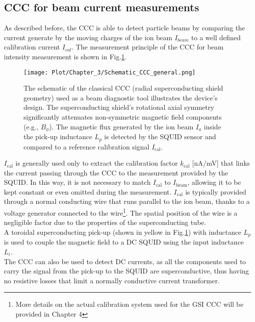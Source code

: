 \documentclass[12pt,a4paper]{report}
\begin{document}
    \subsection{CCC for beam current measurements}
    As described before, the CCC is able to detect particle beams by comparing the current generate by the moving charges of the ion beam $I_{beam}$ to a well defined calibration current $I_{cal}$. The measurement principle of the CCC for beam intensity measurement is shown in Fig.\ref{CH3_Schematic_CCC}.
    \begin{figure} [H]
    	\centering
    	\texttt{[image: Plot/Chapter\_3/Schematic\_CCC\_general.png]}
    	\caption{\small{The schematic of the classical CCC (radial superconducting shield geometry) used as a beam diagnostic tool illustrates the device's design. The superconducting shield's rotational axial symmetry significantly attenuates non-symmetric magnetic field components (e.g., \( B_{\phi} \)). The magnetic flux generated by the ion beam \( I_a \) inside the pick-up inductance \( L_p \) is detected by the SQUID sensor and compared to a reference calibration signal \( I_{\text{cal}} \).}}
    	\label{CH3_Schematic_CCC}
    \end{figure}
    $I_{\text{cal}}$ is generally used only to extract the calibration factor $k_{\text{cal}}$ [nA/mV] that links the current passing through the CCC to the measurement provided by the SQUID. In this way, it is not necessary to match $I_{\text{cal}}$ to $I_{\text{beam}}$, allowing it to be kept constant or even omitted during the measurement. $I_{\text{cal}}$ is typically provided through a normal conducting wire that runs parallel to the ion beam, thanks to a voltage generator connected to the wire\footnote{More details on the actual calibration system used for the GSI CCC will be provided in Chapter 4}. The spatial position of the wire is a negligible factor due to the properties of the superconducting tube.\\
    A toroidal superconducting pick-up (shown in yellow in Fig.\ref{CH3_Schematic_CCC}) with inductance $L_p$ is used to couple the magnetic field to a DC SQUID using the input inductance $L_i$.\\
    The CCC can also be used to detect DC currents, as all the components used to carry the signal from the pick-up to the SQUID are superconductive, thus having no resistive losses that limit a normally conductive current transformer.\\
\end{document}
